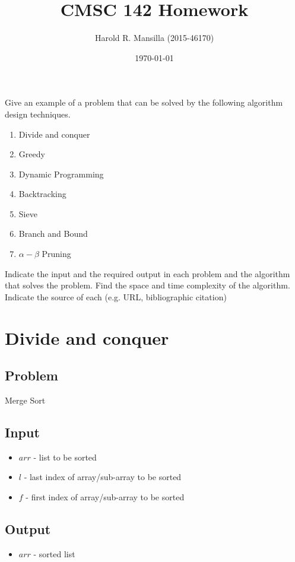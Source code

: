 \documentclass[12pt]{article}%
\begin{document}
\title{CMSC 142 Homework}
\author{Harold R. Mansilla (2015-46170)}
\date{\today}
\maketitle

Give an example of a problem that can be solved by the following algorithm design techniques.
\hspace{5mm}
\begin{enumerate}
  \item Divide and conquer
  \item Greedy
  \item Dynamic Programming
  \item Backtracking
  \item Sieve
  \item Branch and Bound
  \item $\alpha-\beta$ Pruning
\end{enumerate}

Indicate the input and the required output in each problem and the algorithm that solves the problem. Find the space and time complexity of the algorithm. Indicate the source of each (e.g. URL, bibliographic citation)

\newpage

\section{Divide and conquer}
  \subsection{Problem}
    \hspace{5mm}Merge Sort
  \subsection{Input}
    \begin{itemize}
      \item $arr$ - list to be sorted 
      \item $l$ - last index of array/sub-array to be sorted 
      \item $f$ - first index of array/sub-array to be sorted 
    \end{itemize}
  \subsection{Output}
    \begin{itemize}
      \item $arr$ - sorted list
    \end{itemize}
\end{document}

